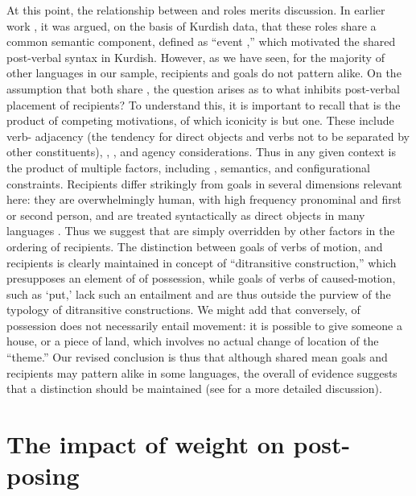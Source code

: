 \documentclass[output=paper,colorlinks,citecolor=brown,collectionchapter]{langscibook}
\begin{document}
At this point, the relationship between  and  roles merits discussion. In earlier work \citep{Haig2022PostPredicateCon}, it was argued, on the basis of Kurdish data, that these roles share a common semantic component, defined as ``event ,'' which motivated the shared post-verbal syntax in Kurdish. However, as we have seen, for the majority of other languages in our sample, recipients and goals do not pattern alike. On the assumption that both share , the question arises as to what inhibits post-verbal placement of recipients? To understand this, it is important to recall that  is the product of competing motivations, of which iconicity is but one. These include verb- adjacency (the tendency for direct objects and verbs not to be separated by other constituents), , , and agency considerations. Thus  in any given context is the product of multiple factors, including , semantics, and configurational constraints. Recipients differ strikingly from goals in several dimensions relevant here: they are overwhelmingly human, with high frequency pronominal and first or second person, and are treated syntactically as direct objects in many languages \citep{Haspelmath2015Ditransitive}. Thus we suggest that  are simply overridden by other factors in the ordering of recipients. The distinction between goals of verbs of motion, and recipients is clearly maintained in  concept of ``ditransitive construction,'' which presupposes an element of  of possession, while goals of verbs of caused-motion, such as `put,' lack such an entailment and are thus outside the purview of the typology of ditransitive constructions. We might add that conversely,  of possession does not necessarily entail movement: it is possible to give someone a house, or a piece of land, which involves no actual change of location of the ``theme.'' Our revised conclusion is thus that although shared  mean goals and recipients may pattern alike in some languages, the overall  of evidence suggests that a distinction should be maintained (see \citealt{haig_goals_2023} for a more detailed discussion).

\section{The impact of weight on post-posing}\label{Intro:ss:5}
\end{document}
